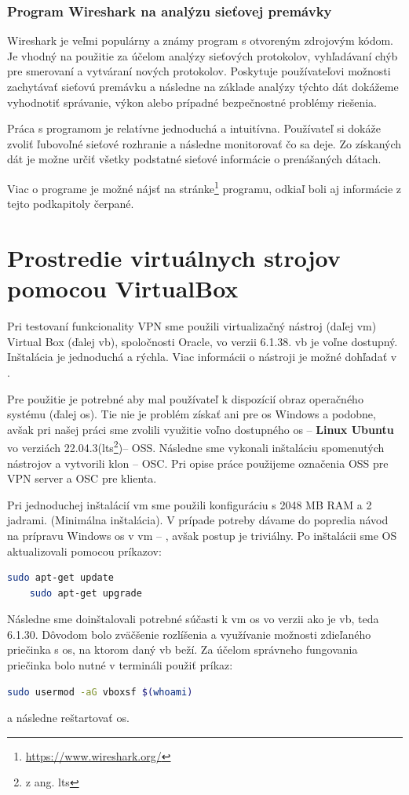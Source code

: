 \subsubsection{Program Wireshark na analýzu sieťovej premávky} 
Wireshark je veľmi populárny a známy program s otvoreným zdrojovým kódom. Je vhodný na použitie za účelom analýzy sieťových protokolov, vyhľadávaní chýb pre smerovaní a vytváraní nových protokolov. Poskytuje používateľovi možnosti zachytávať sieťovú premávku a následne na základe analýzy týchto dát dokážeme vyhodnotiť správanie, výkon alebo prípadné bezpečnostné problémy riešenia.

Práca s programom je relatívne jednoduchá a intuitívna. Používateľ si dokáže zvoliť ľubovoľné sieťové rozhranie a následne monitorovať čo sa deje. Zo získaných dát je možne určiť všetky podstatné sieťové informácie o prenášaných dátach.

Viac o programe je možné nájsť na stránke\footnote{\url{https://www.wireshark.org/}} programu, odkiaľ boli aj informácie z tejto podkapitoly čerpané. 

\section{Prostredie virtuálnych strojov pomocou VirtualBox}\label{merania}
Pri testovaní funkcionality VPN sme použili virtualizačný nástroj (daľej \acrshort{vm}) Virtual Box (ďalej \acrshort{vb}), spoločnosti Oracle, vo verzii 6.1.38. \acrshort{vb} je voľne dostupný. Inštalácia je jednoduchá a rýchla. Viac informácii o nástroji je možné dohľadať v \cite{vbox}.

Pre použitie je potrebné aby mal používateľ k dispozícií obraz operačného systému (ďalej \acrshort{os}). Tie nie je problém získať ani pre \acrshort{os} Windows a podobne, avšak pri našej práci sme zvolili využitie voľno dostupného  \acrshort{os} -- \textbf{Linux Ubuntu} vo verziách 22.04.3(\acrshort{lts}\footnote{z ang. \acrlong{lts}})-- OSS. Následne sme vykonali inštaláciu spomenutých nástrojov a vytvorili klon -- OSC. Pri opise práce použijeme označenia OSS pre VPN server a OSC pre klienta.

Pri jednoduchej inštalácií \acrshort{vm} sme použili konfiguráciu s  2048 MB RAM a 2 jadrami. (Minimálna inštalácia). V prípade potreby dávame do popredia návod na prípravu Windows \acrshort{os} v \acrshort{vm} -- \cite{vmkonfig}, avšak postup je triviálny. Po inštalácii sme OS aktualizovali pomocou príkazov:
\begin{lstlisting}[language=bash]
	sudo apt-get update
	sudo apt-get upgrade
\end{lstlisting}
Následne sme doinštalovali potrebné súčasti k \acrshort{vm} \acrshort{os} vo verzii ako je \acrshort{vb}, teda 6.1.30. Dôvodom bolo zväčšenie rozlíšenia a využívanie možnosti zdieľaného priečinka s \acrshort{os}, na ktorom daný \acrshort{vb} beží. Za účelom správneho fungovania priečinka bolo nutné v termináli použiť príkaz:
\begin{lstlisting}[language=bash]
	sudo usermod -aG vboxsf $(whoami)
\end{lstlisting}
a následne reštartovať \acrshort{os}.


